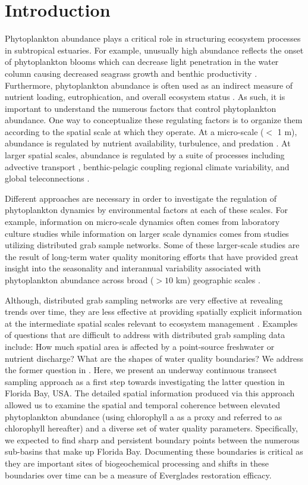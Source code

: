 \section{Introduction}
\label{intro}
Phytoplankton abundance plays a critical role in structuring ecosystem processes in subtropical estuaries. For example, unusually high abundance reflects the onset of phytoplankton blooms which can decrease light penetration in the water column causing decreased seagrass growth and benthic productivity \citep{kelble_2005}. Furthermore, phytoplankton abundance is often used as an indirect measure of nutrient loading, eutrophication, and overall ecosystem status \citep{boyer_2009}. As such, it is important to understand the numerous factors that control phytoplankton abundance. One way to conceptualize these regulating factors is to organize them according to the spatial scale at which they operate. At a micro-scale ($<$ 1 m), abundance is regulated by nutrient availability, turbulence, and predation \cite{mann2013dynamics}. At larger spatial scales, abundance is regulated by a suite of processes including advective transport \cite{dugdale2012river}, benthic-pelagic coupling \cite{zhang_2014, lawrence2004wind} regional climate variability, and global teleconnections \cite{briceno_climatic_2009}.

Different approaches are necessary in order to investigate the regulation of phytoplankton dynamics by environmental factors at each of these scales. For example, information on micro-scale dynamics often comes from laboratory culture studies while information on larger scale dynamics comes from studies utilizing distributed grab sample networks. Some of these larger-scale studies are the result of long-term water quality monitoring efforts that have provided great insight into the seasonality and interannual variability associated with phytoplankton abundance across broad ($>10$ km) geographic scales \cite{cloern_patterns_2010}.

Although, distributed grab sampling networks are very effective at revealing trends over time, they are less effective at providing spatially explicit information at the intermediate spatial scales relevant to ecosystem management \cite{anttila2008feasible}. Examples of questions that are difficult to address with distributed grab sampling data include: How much spatial area is affected by a point-source freshwater or nutrient discharge? What are the shapes of water quality boundaries? We address the former question in \citep{stachelek_application_2015}. Here, we present an underway continuous transect sampling approach as a first step towards investigating the latter question in Florida Bay, USA. The detailed spatial information produced via this approach allowed us to examine the spatial and temporal coherence between elevated phytoplankton abundance (using chlorophyll a as a proxy and referred to as chlorophyll hereafter) and a diverse set of water quality parameters. Specifically, we expected to find sharp and persistent boundary points between the numerous sub-basins that make up Florida Bay. Documenting these boundaries is critical as they are important sites of biogeochemical processing and shifts in these boundaries over time can be a measure of Everglades restoration efficacy.
